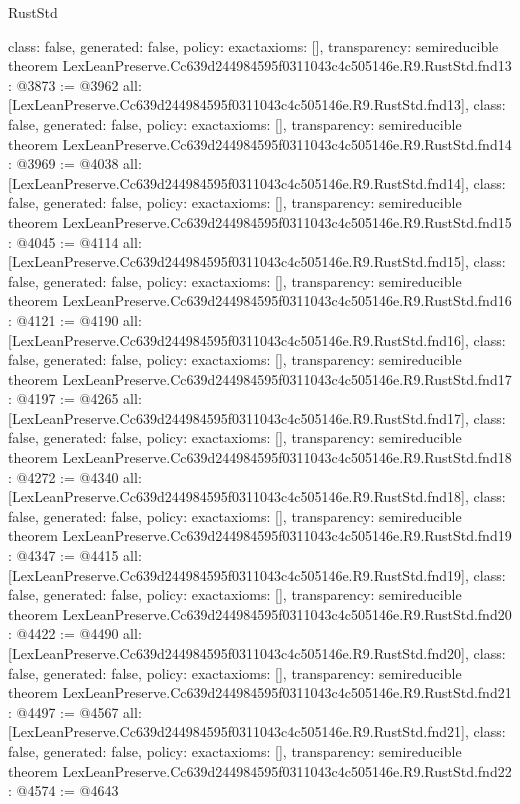 \begin{lexlean}{RustStd}
\begin{coremodule}
{  class: false,
  generated: false,
  policy: exact{axioms: []},
  transparency: semireducible
}
theorem LexLeanPreserve.Cc639d244984595f0311043c4c505146e.R9.RustStd.fnd13 : @3873 := @3962 {
  all: [LexLeanPreserve.Cc639d244984595f0311043c4c505146e.R9.RustStd.fnd13],
  class: false,
  generated: false,
  policy: exact{axioms: []},
  transparency: semireducible
}
theorem LexLeanPreserve.Cc639d244984595f0311043c4c505146e.R9.RustStd.fnd14 : @3969 := @4038 {
  all: [LexLeanPreserve.Cc639d244984595f0311043c4c505146e.R9.RustStd.fnd14],
  class: false,
  generated: false,
  policy: exact{axioms: []},
  transparency: semireducible
}
theorem LexLeanPreserve.Cc639d244984595f0311043c4c505146e.R9.RustStd.fnd15 : @4045 := @4114 {
  all: [LexLeanPreserve.Cc639d244984595f0311043c4c505146e.R9.RustStd.fnd15],
  class: false,
  generated: false,
  policy: exact{axioms: []},
  transparency: semireducible
}
theorem LexLeanPreserve.Cc639d244984595f0311043c4c505146e.R9.RustStd.fnd16 : @4121 := @4190 {
  all: [LexLeanPreserve.Cc639d244984595f0311043c4c505146e.R9.RustStd.fnd16],
  class: false,
  generated: false,
  policy: exact{axioms: []},
  transparency: semireducible
}
theorem LexLeanPreserve.Cc639d244984595f0311043c4c505146e.R9.RustStd.fnd17 : @4197 := @4265 {
  all: [LexLeanPreserve.Cc639d244984595f0311043c4c505146e.R9.RustStd.fnd17],
  class: false,
  generated: false,
  policy: exact{axioms: []},
  transparency: semireducible
}
theorem LexLeanPreserve.Cc639d244984595f0311043c4c505146e.R9.RustStd.fnd18 : @4272 := @4340 {
  all: [LexLeanPreserve.Cc639d244984595f0311043c4c505146e.R9.RustStd.fnd18],
  class: false,
  generated: false,
  policy: exact{axioms: []},
  transparency: semireducible
}
theorem LexLeanPreserve.Cc639d244984595f0311043c4c505146e.R9.RustStd.fnd19 : @4347 := @4415 {
  all: [LexLeanPreserve.Cc639d244984595f0311043c4c505146e.R9.RustStd.fnd19],
  class: false,
  generated: false,
  policy: exact{axioms: []},
  transparency: semireducible
}
theorem LexLeanPreserve.Cc639d244984595f0311043c4c505146e.R9.RustStd.fnd20 : @4422 := @4490 {
  all: [LexLeanPreserve.Cc639d244984595f0311043c4c505146e.R9.RustStd.fnd20],
  class: false,
  generated: false,
  policy: exact{axioms: []},
  transparency: semireducible
}
theorem LexLeanPreserve.Cc639d244984595f0311043c4c505146e.R9.RustStd.fnd21 : @4497 := @4567 {
  all: [LexLeanPreserve.Cc639d244984595f0311043c4c505146e.R9.RustStd.fnd21],
  class: false,
  generated: false,
  policy: exact{axioms: []},
  transparency: semireducible
}
theorem LexLeanPreserve.Cc639d244984595f0311043c4c505146e.R9.RustStd.fnd22 : @4574 := @4643 {
}
\end{coremodule}
\end{lexlean}
